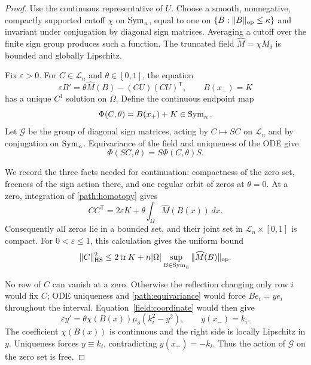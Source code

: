 \begin{proof}
Use the continuous representative of $U$.  Choose a smooth,
nonnegative, compactly supported cutoff $\chi$ on $\operatorname{Sym}_n$, equal
to one on $\{B:\|B\|_{\operatorname{op}}\leq\kappa\}$ and invariant under
conjugation by diagonal sign matrices.  Averaging a cutoff over
the finite sign group produces such a function.  The truncated
field $\widehat M=\chi M_\delta$ is bounded and globally Lipschitz.

Fix $\varepsilon>0$.  For $C\in\mathcal L_n$ and
$\theta\in[0,1]$, the equation
\begin{equation}\label{path:homotopy}
 \varepsilon B'=\theta\widehat M(B)-(CU)(CU)^{\mathsf T},
                         \qquad B(x_-)=K
\end{equation}
has a unique $C^1$ solution on $\overline\Omega$.  Define the
continuous endpoint map
\[
                  \Phi(C,\theta)=B(x_+)+K\in\operatorname{Sym}_n.
\]
Let $\mathcal G$ be the group of diagonal sign matrices, acting
by $C\mapsto SC$ on $\mathcal L_n$ and by conjugation on
$\operatorname{Sym}_n$.  Equivariance of the field and uniqueness of the ODE give
\begin{equation}\label{path:equivariance}
                       \Phi(SC,\theta)=S\Phi(C,\theta)S.
\end{equation}

We record the three facts needed for continuation: compactness
of the zero set, freeness of the sign action there, and one regular
orbit of zeros at $\theta=0$.
At a zero, integration of \eqref{path:homotopy} gives
\begin{equation}\label{path:C-identity}
       CC^{\mathsf T}=2\varepsilon K
                       +\theta\int_\Omega\widehat M(B(x))\,dx.
\end{equation}
Consequently all zeros lie in a bounded set, and their joint set
in $\mathcal L_n\times[0,1]$ is compact.  For
$0<\varepsilon\leq1$, this calculation gives the uniform bound
\begin{equation}\label{path:C-bound}
 \|C\|_{\mathrm{HS}}^2\leq2\operatorname{tr} K
       +n|\Omega|\sup_{B\in\operatorname{Sym}_n}\|\widehat M(B)\|_{\operatorname{op}}.
\end{equation}

No row of $C$ can vanish at a zero.  Otherwise the reflection
changing only row $i$ would fix $C$; ODE uniqueness and
\eqref{path:equivariance} would force $Be_i=y e_i$ throughout the
interval.  Equation~\eqref{field:coordinate} would then give
\[
 \varepsilon y'=\theta\chi(B(x))\mu_\delta(k_i^2-y^2),
                         \qquad y(x_-)=k_i.
\]
The coefficient $\chi(B(x))$ is continuous and the right side
is locally Lipschitz in $y$.  Uniqueness forces $y\equiv k_i$,
contradicting $y(x_+)=-k_i$.  Thus the action of $\mathcal G$
on the zero set is free.


\end{proof}
